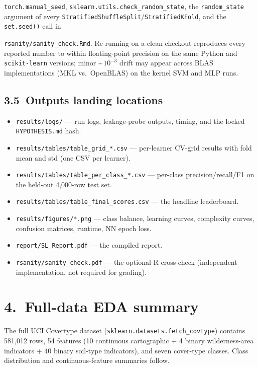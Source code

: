 \documentclass[11pt]{article}
\begin{document}
\texttt{torch.manual\_seed}, \texttt{sklearn.utils.check\_random\_state},
the \texttt{random\_state} argument of every
\texttt{StratifiedShuffleSplit}/\texttt{StratifiedKFold}, and the
\texttt{set.seed()} call in 

\texttt{rsanity/sanity\_check.Rmd}. Re-running on
a clean checkout reproduces every reported number to within floating-point
precision on the same Python and \texttt{scikit-learn} versions; minor
\textasciitilde\,$10^{-3}$ drift may appear across BLAS implementations
(MKL vs.\ OpenBLAS) on the kernel SVM and MLP runs.

\subsection*{3.5\ Outputs landing locations}
\begin{itemize}[leftmargin=*,nosep]
  \item \texttt{results/logs/} --- run logs, leakage-probe outputs, timing,
        and the locked \texttt{HYPOTHESIS.md} hash.
  \item \texttt{results/tables/table\_grid\_*.csv} --- per-learner CV-grid
        results with fold mean and std (one CSV per learner).
  \item \texttt{results/tables/table\_per\_class\_*.csv} --- per-class
        precision/recall/F1 on the held-out 4{,}000-row test set.
  \item \texttt{results/tables/table\_final\_scores.csv} --- the headline
        leaderboard.
  \item \texttt{results/figures/*.png} --- class balance, learning curves,
        complexity curves, confusion matrices, runtime, NN epoch loss.
  \item \texttt{report/SL\_Report.pdf} --- the compiled report.
  \item \texttt{rsanity/sanity\_check.pdf} --- the optional R cross-check
        (independent implementation, not required for grading).
\end{itemize}

\section*{4.\ Full-data EDA summary}
The full UCI Covertype dataset (\texttt{sklearn.datasets.fetch\_covtype})
contains 581{,}012 rows, 54 features (10 continuous cartographic +
4 binary wilderness-area indicators + 40 binary soil-type indicators), and
seven cover-type classes. Class distribution and continuous-feature
summaries follow.
\end{document}

